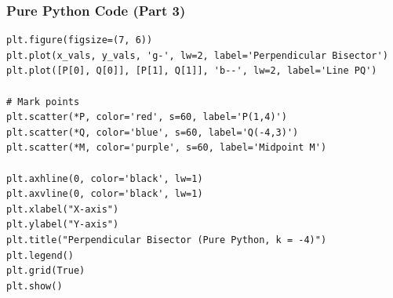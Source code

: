 \documentclass{beamer}
\begin{document}
\begin{frame}[fragile]
\frametitle{Pure Python Code (Part 3)}
\begin{lstlisting}
plt.figure(figsize=(7, 6))
plt.plot(x_vals, y_vals, 'g-', lw=2, label='Perpendicular Bisector')
plt.plot([P[0], Q[0]], [P[1], Q[1]], 'b--', lw=2, label='Line PQ')

# Mark points
plt.scatter(*P, color='red', s=60, label='P(1,4)')
plt.scatter(*Q, color='blue', s=60, label='Q(-4,3)')
plt.scatter(*M, color='purple', s=60, label='Midpoint M')

plt.axhline(0, color='black', lw=1)
plt.axvline(0, color='black', lw=1)
plt.xlabel("X-axis")
plt.ylabel("Y-axis")
plt.title("Perpendicular Bisector (Pure Python, k = -4)")
plt.legend()
plt.grid(True)
plt.show()
\end{lstlisting}
\end{frame}

\end{document}
